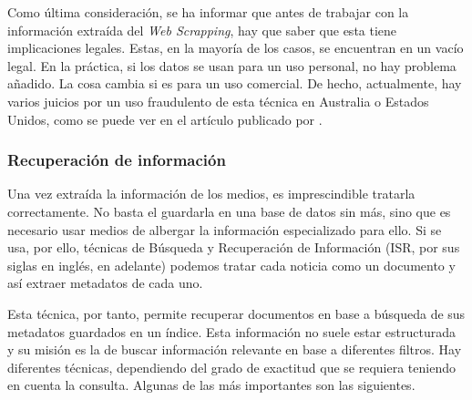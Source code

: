 Como última consideración, se ha informar que antes de trabajar con la información extraída del \textit{Web Scrapping}, hay que saber que esta tiene implicaciones legales. Estas, en la mayoría de los casos, se encuentran en un vacío legal. En la práctica, si los datos se usan para un uso personal, no hay problema añadido. La cosa cambia si es para un uso comercial. De hecho, actualmente, hay varios juicios por un uso fraudulento de esta técnica en Australia o Estados Unidos, como se puede ver en el artículo publicado por .

\subsubsection{Recuperación de información}
Una vez extraída la información de los medios, es imprescindible tratarla correctamente. No basta el guardarla en una base de datos sin más, sino que es necesario usar medios de albergar la información especializado para ello. Si se usa, por ello, técnicas de Búsqueda y Recuperación de Información (ISR, por sus siglas en inglés, en adelante) podemos tratar cada noticia como un documento y así extraer metadatos de cada uno.


Esta técnica, por tanto, permite recuperar documentos en base a búsqueda de sus metadatos guardados en un índice. Esta información no suele estar estructurada y su misión es la de buscar información relevante en base a diferentes filtros. Hay diferentes técnicas, dependiendo del grado de exactitud que se requiera teniendo en cuenta la consulta. Algunas de las más importantes son las siguientes.

